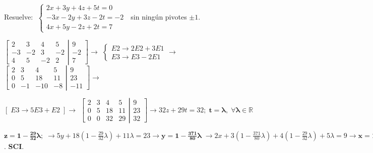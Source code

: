 \begin{ejre} 
Resuelve: $\; \begin{cases} 2x+3y+4z+5t=0\\-3x-2y+3z-2t=-2\\4x+5y-2z+2t=7  \end{cases}\; $  \footnotesize{\textcolor{gris}{sin ningún pivotes $\pm 1$}}\normalsize{.}
\end{ejre}
\begin{proofw}\renewcommand{\qedsymbol}{$\diamond$}

$\left[ \begin{matrix}
  2 & 3 & 4 & 5 \\ -3 & -2 & 3 & -2 \\ 4 & 5 & -2 & 2 
 \end{matrix}\right. 
 \left| \begin{matrix}
  9 \\ -2 \\ 7 
 \end{matrix}\right] \to $
 \textcolor{gris}{$\begin{cases} E2\to 2E2+3E1 \\ E3 \to E3-2E1  \end{cases} \to $}
$\left[ \begin{matrix}
  2 & 3 & 4 & 5 \\ 0 & 5 & 18 & 11 \\ 0 & -1 & -10 & -8 
 \end{matrix}\right. 
 \left| \begin{matrix}
  9 \\ 23 \\ -11 
 \end{matrix}\right] \to $
 
\noindent \textcolor{gris}{$[\; E3 \to 5E3+E2 \; ] \to $}
$\left[ \begin{matrix}
  2 & 3 & 4 & 5 \\ 0 & 5 & 18 & 11 \\ 0 & 0 & 32 & 29 
 \end{matrix}\right. 
 \left| \begin{matrix}
  9 \\ 23 \\ 32 
 \end{matrix}\right] \to 32z+29t=32; \; \boldsymbol{t=\lambda, \; \forall \lambda \in \mathbb R}$
 
 \noindent $\boldsymbol{z=1-\frac{29}{32}\lambda}; \; \to 5y+18(1-\frac{29}{32}\lambda)+11 \lambda =23 \to \boldsymbol{y=1-\frac {371}{80}\lambda}\; \to 2x+3(1-\frac {371}{80}\lambda)+4(1-\frac{29}{32}\lambda)+5\lambda = 9 \to \boldsymbol{x=1-\frac{1003}{160}\lambda}\; $. \textbf{SCI}.
\end{proofw}

